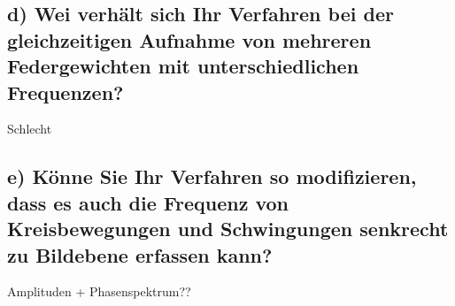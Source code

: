 \subsection*{d) Wei verh\"alt sich Ihr Verfahren bei der gleichzeitigen Aufnahme von mehreren Federgewichten mit unterschiedlichen Frequenzen?}
Schlecht

\subsection*{e) K\"onne Sie Ihr Verfahren so modifizieren, dass es auch die Frequenz von Kreisbewegungen und Schwingungen senkrecht zu Bildebene  erfassen kann?}
Amplituden + Phasenspektrum??